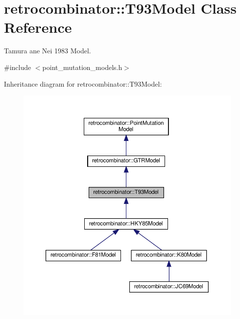 \hypertarget{classretrocombinator_1_1T93Model}{}\section{retrocombinator\+:\+:T93\+Model Class Reference}
\label{classretrocombinator_1_1T93Model}


Tamura ane Nei 1983 Model.  




{\ttfamily \#include $<$point\+\_\+mutation\+\_\+models.\+h$>$}



Inheritance diagram for retrocombinator\+:\+:T93\+Model\+:
\nopagebreak
\begin{figure}[H]
\begin{center}
\leavevmode
\includegraphics[width=350pt]{classretrocombinator_1_1T93Model__inherit__graph}
\end{center}
\end{figure}


